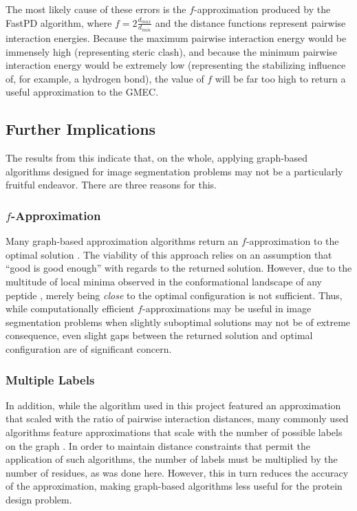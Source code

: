 \documentclass[11pt]{article}
\begin{document}
	The most likely cause of these errors is the $f$-approximation produced by
	the FastPD algorithm, where $f = 2 \frac{d_{max}}{d_{min}}$ and the distance
	functions represent pairwise interaction energies. Because the maximum pairwise
	interaction energy would be immensely high (representing steric clash), and
	because the minimum pairwise interaction energy would be extremely low
	(representing the stabilizing influence of, for example, a hydrogen bond), the
	value of $f$ will be far too high to return a useful approximation to the GMEC. 
	
	\subsection{Further Implications}
	The results from this indicate that, on the whole, applying graph-based algorithms
	designed for image segmentation problems may not be a particularly fruitful
	endeavor. There are three reasons for this. 
	
	\subsubsection{$f$-Approximation}
	Many graph-based approximation algorithms return an $f$-approximation to
	the optimal solution \cite{CKNZ}. The viability of this approach relies
	on an assumption that ``good is good enough'' with regards to the returned
	solution.  However, due to the multitude of local minima observed in the
	conformational landscape of any peptide \cite{DCM0}, merely being \textit{close}
	to the optimal configuration is not sufficient. Thus, while computationally
	efficient $f$-approximations may be useful in image segmentation problems 
	when slightly suboptimal solutions may not be of extreme consequence, even
	slight gaps between the returned solution and optimal configuration are of
	significant concern. 
	
	\subsubsection{Multiple Labels}
	In addition, while the algorithm used in this project featured an approximation
	that scaled with the ratio of pairwise interaction distances, many commonly 
	used algorithms feature approximations that scale with the number of possible
	labels on the graph \cite{BVZ1}. In order to maintain distance constraints that
	permit the application of such algorithms, the number of labels must be 
	multiplied by the number of residues, as was done here. However, this in turn
	reduces the accuracy of the approximation, making graph-based algorithms less
	useful for the protein design problem. 	
	
\end{document}
